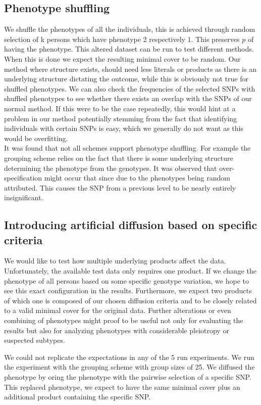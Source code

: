 \documentclass[letterpaper, 11pt]{article}
\begin{document}
\subsection{Phenotype shuffling}
We shuffle the phenotypes of all the individuals, this is achieved through random selection of k persons which have phenotype 2 respectively 1. This preserves $p$ of having the phenotype. 
This altered dataset can be run to test different methods. When this is done we expect the resulting minimal cover to be random. 
Our method where structure exists, should need less literals or products as there is an underlying structure dictating the outcome, while this is obviously not true for shuffled phenotypes. We can also check the frequencies of the selected SNPs with shuffled phenotypes to see whether there exists an overlap with the SNPs of our normal method. If this were to be the case repeatedly, this  would hint at a problem in our method potentially stemming from the fact that identifying individuals with certain SNPs is easy, which we generally do not want as this would be overfitting.\\
It was found that not all schemes support phenotype shuffling. For example the grouping scheme relies on the fact that there is some underlying structure determining the phenotype from the  genotypes. It was observed that over-specification might occur that since due to the phenotypes being random attributed. This causes the SNP from a previous level to be nearly entirely insignificant. \\


\subsection{Introducing artificial diffusion based on specific criteria}

We would like to test how multiple underlying products affect the data. Unfortunately, the available test data only requires one product. If we change the phenotype of all persons based on some specific genotype variation, we hope to see this exact configuration in the results. Furthermore, we expect two products of which one is composed of our chosen diffusion criteria and to be closely related to a valid minimal cover for the original data. Further alterations or even combining of phenotypes might proof to be useful not only for evaluating the results but also for analyzing phenotypes with considerable pleiotropy or suspected subtypes.

We could not replicate the expectations in any of the 5 run experiments. We run the experiment with the grouping scheme with group sizes of 25. We diffused the phenotype by oring the phenotype with the pairwise selection of a specific SNP. This replaced phenotype, we expect to have the same minimal cover plus an additional product containing the specific SNP.  
\end{document}
